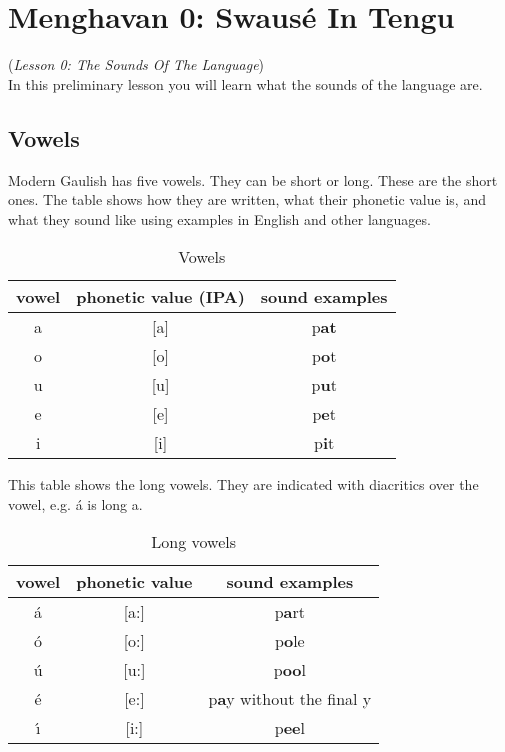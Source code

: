 \section{Menghavan 0: Swaus\'{e} In Tengu}
(\textit{Lesson 0: The Sounds Of The Language})\\

\noindent In this preliminary lesson you will learn what the sounds of the language are.

\subsection{Vowels}
\noindent Modern Gaulish has five vowels. They can be short or long. These are the short ones. The table shows how they are written, what their phonetic value is, and what they sound like using examples in English and other languages.

\begin{table}[H]
\begin{center}
\begin{tabu}{c|c|c}
  \textbf{vowel} & \textbf{phonetic value (IPA)} & \textbf{sound examples}\\
  \toprule
  a & [a] & p\textbf{at}\\
  o & [o] & p\textbf{o}t\\
  u & [u] & p\textbf{u}t\\
  e & [e] & p\textbf{e}t\\
  i & [i] & p\textbf{i}t\\
\end{tabu}
\end{center}
\caption{Vowels}
\label{phonology_vowels}
\end{table}

This table shows the long vowels. They are indicated with diacritics over the vowel, e.g. \'{a} is long a.

\begin{table}[H]
\begin{center}
\begin{tabu}{c|c|c}
  \textbf{vowel} & \textbf{phonetic value} & \textbf{sound examples}\\
  \toprule
  \'{a} & [a:] & p\textbf{a}rt\\
  \'{o} & [o:] & p\textbf{o}le\\
  \'{u} & [u:] & p\textbf{oo}l\\
  \'{e} & [e:] & p\textbf{a}y without the final y\\
  \'{\i} & [i:] & p\textbf{ee}l\\
\end{tabu}
\end{center}
\caption{Long vowels}
\label{phonology_long_vowels}
\end{table}

